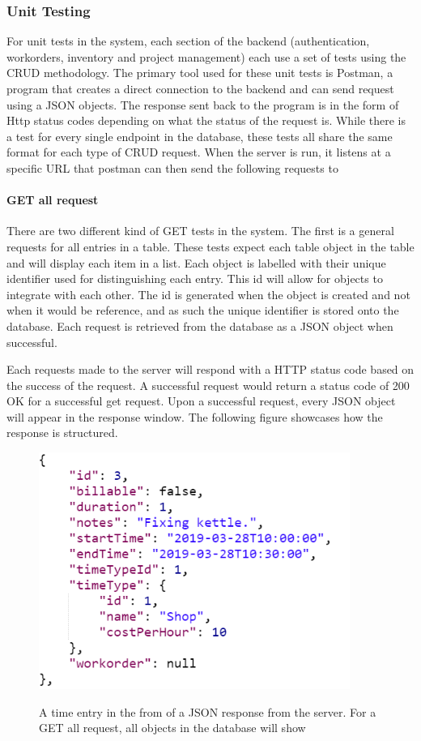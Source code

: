 {{\subsubsection{Unit Testing}
For unit tests in the system, each section of the backend (authentication, workorders, inventory and project management) each use a set of tests using the CRUD methodology. The primary tool used for these unit tests is Postman, a program that creates a direct connection to the backend and can send request using a JSON objects. The response sent back to the program is in the form of Http status codes depending on what the status of the request is. While there is a test for every single endpoint in the database, these tests all share the same format for each type of CRUD request. When the server is run, it listens at a specific URL that postman can then send the following requests to 

\paragraph{GET all request}
There are two different kind of GET tests in the system. The first is a general requests for all entries in a table. These tests expect each table object in the table and will display each item in a list. Each object is labelled with their unique identifier used for distinguishing each entry. This id will allow for objects to integrate with each other. The id is generated when the object is created and not when it would be reference, and as such the unique identifier is stored onto the database. Each request is retrieved from the database as a JSON object when successful. 
\newline
{\setlength{\parindent}{0cm}

Each requests made to the server will respond with a HTTP status code based on the success of the request. A successful request would return a status code of 200 OK for a successful get request. Upon a successful request, every JSON object will appear in the response window. The following figure showcases how the response is structured. 
\begin{figure}[H]
	\centering
	\includegraphics[width=4in]{JSON-post-recieve.png}\\
	\caption{A time entry in the from of a JSON response from the server. For a GET all request, all objects in the database will show}
	\label{fig:tobias}
\end{figure}

}}}
